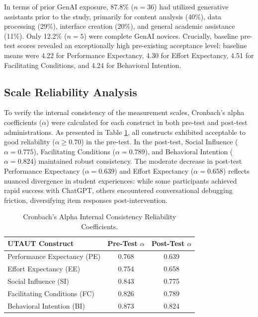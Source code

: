 \documentclass{cleiej}
\begin{document}
In terms of prior GenAI exposure, 87.8\% ($n = 36$) had utilized generative assistants prior to the study, primarily for content analysis (40\%), data processing (29\%), interface creation (20\%), and general academic assistance (11\%). Only 12.2\% ($n = 5$) were complete GenAI novices. Crucially, baseline pre-test scores revealed an exceptionally high pre-existing acceptance level: baseline means were 4.22 for Performance Expectancy, 4.30 for Effort Expectancy, 4.51 for Facilitating Conditions, and 4.24 for Behavioral Intention.

\subsection{Scale Reliability Analysis}
To verify the internal consistency of the measurement scales, Cronbach's alpha coefficients ($\alpha$) were calculated for each construct in both pre-test and post-test administrations. As presented in Table \ref{tab:reliability}, all constructs exhibited acceptable to good reliability ($\alpha \ge 0.70$) in the pre-test. In the post-test, Social Influence ($\alpha = 0.775$), Facilitating Conditions ($\alpha = 0.789$), and Behavioral Intention ($\alpha = 0.824$) maintained robust consistency. The moderate decrease in post-test Performance Expectancy ($\alpha = 0.639$) and Effort Expectancy ($\alpha = 0.658$) reflects nuanced divergence in student experiences: while some participants achieved rapid success with ChatGPT, others encountered conversational debugging friction, diversifying item responses post-intervention.

\begin{table}[ht]
\centering
\caption{Cronbach's Alpha Internal Consistency Reliability Coefficients.}
\label{tab:reliability}
\begin{tabular}{lcc}
\toprule
\textbf{UTAUT Construct} & \textbf{Pre-Test $\alpha$} & \textbf{Post-Test $\alpha$} \\
\midrule
Performance Expectancy (PE) & 0.768 & 0.639 \\
Effort Expectancy (EE)      & 0.754 & 0.658 \\
Social Influence (SI)       & 0.843 & 0.775 \\
Facilitating Conditions (FC) & 0.826 & 0.789 \\
Behavioral Intention (BI)   & 0.873 & 0.824 \\
\bottomrule
\end{tabular}
\end{table}
\end{document}
